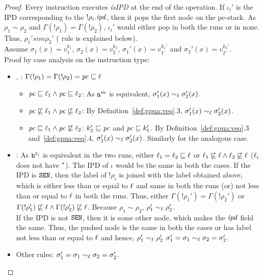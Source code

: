 \begin{proof}
Every instruction executes \emph{isIPD} at the end of the operation. 
If $\iota_i'$ is the IPD corresponding to the $!\rho_i.\mathit{ipd}$, then it pops
the first node on the pc-stack. As $\rho_1 \sim \rho_2$ and
$\Gamma(!\rho_1)  = \Gamma(!\rho_2)$, $\iota_i'$ would either pop in
both the runs or in none. Thus, $\rho_1' sim \rho_2'$
( rule is explained below). \\
Assume $\sigma_1(x) = v_1^{k_1}$, $\sigma_2(x) = v_2^{k_2}$,
$\sigma_1'(x) = v_{1'}^{k_1'}$ and $\sigma_2'(x) = v_{2'}^{k_2'}$. \\
Proof by case analysis on the instruction type:
\begin{itemize}
\item {}, :
  $\Gamma(!\rho_1) = \Gamma(!\rho_2) = \mathit{pc} \sqsubseteq \ell$
  \begin{itemize} 
  \item $\mathit{pc} \sqsubseteq \ell_1 \wedge \mathit{pc} \sqsubseteq \ell_2$: As
    $\texttt{n}^m$ is equivalent, $\sigma_1'(x) \sim_\ell \sigma_2'(x)$.  

  \item $\mathit{pc} \not\sqsubseteq \ell_1 \wedge \mathit{pc} \not\sqsubseteq
    \ell_2$: By Definition~\ref{def:gpua:veq}.3, $\sigma_1'(x)
    \sim_\ell \sigma_2'(x)$.   

  \item $\mathit{pc} \sqsubseteq \ell_1 \wedge
    \mathit{pc}  \not\sqsubseteq \ell_2$: $k_2' \sqsubseteq \mathit{pc}$ and $\mathit{pc}
    \sqsubseteq k_1'$. By Definition~\ref{def:gpua:veq}.3
    and~\ref{def:gpua:veq}.4, $\sigma_1'(x) \sim_\ell \sigma_2'(x)$.
    Similarly for the analogous case. 
  \end{itemize}

\item {}: As $\texttt{b}^{\ell_i}$ is equivalent in the
  two runs, either $\ell_1 = \ell_2 \sqsubseteq \ell$ or $\ell_1
  \not\sqsubseteq \ell \wedge \ell_2 \not\sqsubseteq \ell$ ($\ell_i$
  does not have ${}^\star$). 
  The IPD of $\iota$ would be the same in both the cases. If the IPD
  is $\texttt{SEN}$, then the label of $!\rho_i$ is joined with the
  label obtained above, which is either less than or equal to $\ell$
  and same in both the runs (or) not less than or equal to $\ell$ in
  both the runs. Thus, either $\Gamma(!\rho_1') = \Gamma(!\rho_2')$ or
  $\Gamma(!\rho_1') \not\sqsubseteq \ell \wedge \Gamma(!\rho_2')
  \not\sqsubseteq \ell$.
  Because $\rho_1 \sim \rho_2$, $\rho_1' \sim_\ell \rho_2'$. \\
  If the IPD is not $\texttt{SEN}$, then it is some other node, which makes the
  $\mathit{ipd}$ field the same.  
  Thus, the pushed node is the same in both the cases or has label not
  less than or equal to $\ell$ and hence, $\rho_1' \sim_\ell \rho_2'$
  $\sigma'_1 = \sigma_1 \sim_\ell \sigma_2 = \sigma'_2$.

\item Other rules: $\sigma'_1 = \sigma_1 \sim_\ell \sigma_2 = \sigma'_2$.
\end{itemize}
\end{proof}



